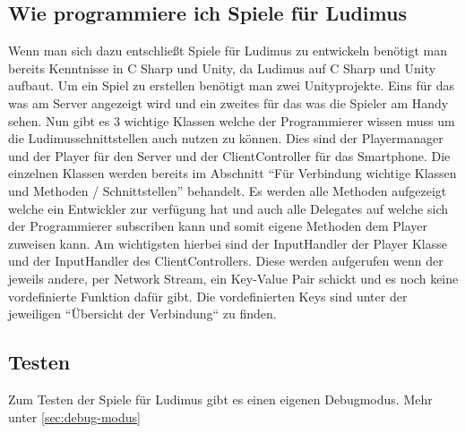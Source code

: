 \subsection{Wie programmiere ich Spiele für Ludimus}
Wenn man sich dazu entschließt Spiele für Ludimus zu entwickeln benötigt man bereits Kenntnisse in C Sharp und Unity, da Ludimus auf C Sharp und Unity aufbaut. Um ein Spiel zu erstellen benötigt man zwei Unityprojekte. Eins für das was am Server angezeigt wird und ein zweites für das was die Spieler am Handy sehen. Nun gibt es 3 wichtige Klassen welche der Programmierer wissen muss um die Ludimusschnittstellen auch nutzen zu können. Dies sind der Playermanager und der Player für den Server und der ClientController für das Smartphone.
Die einzelnen Klassen werden bereits im Abschnitt “Für Verbindung wichtige Klassen und Methoden / Schnittstellen” behandelt. Es werden alle Methoden aufgezeigt welche ein Entwickler zur verfügung hat und auch alle Delegates auf welche sich der Programmierer subscriben kann und somit eigene Methoden dem Player zuweisen kann. Am wichtigsten hierbei sind der InputHandler der Player Klasse und der InputHandler des ClientControllers. Diese werden aufgerufen wenn der jeweils andere, per Network Stream, ein Key-Value Pair schickt und es noch keine vordefinierte Funktion dafür gibt. Die vordefinierten Keys sind unter der jeweiligen “Übersicht der Verbindung“ zu finden.
\subsection{Testen}
Zum Testen der Spiele für Ludimus gibt es einen eigenen Debugmodus. Mehr unter \ref{sec:debug-modus}
